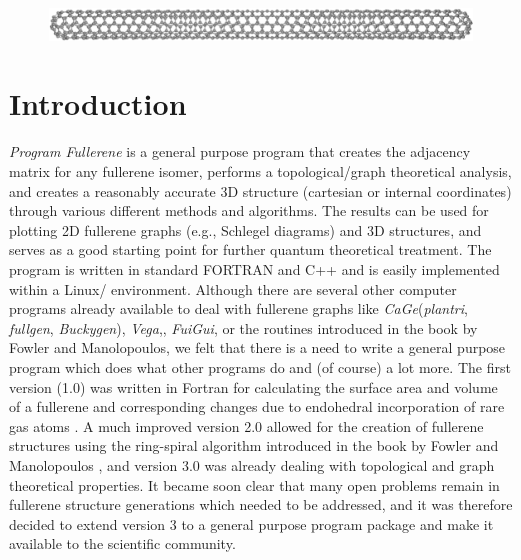 \documentclass[article,a4paper,twoside]{memoir}
\let\acr=\textsmaller
\newcommand{\program}[1]{\textit{#1}}
\begin{document}
 \begin{figure}[htbp]
   	\centering
  	\includegraphics[width=\textwidth]{C840.png}
 \end{figure} 

\clearpage

\section{Introduction}
\textit{Program Fullerene} is a general purpose program that creates the adjacency matrix for any fullerene isomer, 
performs a topological/graph theoretical analysis, and creates a reasonably accurate 3D structure (cartesian or internal
coordinates) through various different methods and algorithms. The results can be used for plotting 2D fullerene graphs 
(e.g., Schlegel diagrams) and 3D structures, and serves as a good starting point for further quantum theoretical treatment.
The program is written in standard FORTRAN and C++ and is easily implemented within a Linux/\acr{UNIX} environment.
Although there are several other computer programs already available to deal with fullerene graphs like 
\program{CaGe}(\program{plantri},\cite{Brinkmann05} \program{fullgen},\cite{Brinkmann} \program{Buckygen}\cite{Goedgebeur,Goedgebeur1}),\cite{Brinkmanx}
\program{Vega},\cite{Pisanski}, \program{FuiGui},\cite{FuiGui}  or the routines introduced in the book by Fowler and Manolopoulos,\cite{Atlas}
we felt that there is a need to write a general purpose program which does what other programs do and (of course) a lot more.
The first version (1.0) was written in Fortran for calculating the surface area and volume of a fullerene and corresponding changes due to endohedral 
incorporation of rare gas atoms \cite{Tonner}. A much improved version 2.0 allowed for the creation of fullerene structures using
the ring-spiral algorithm introduced in the book by Fowler and Manolopoulos \cite{Atlas}, and version 3.0 was already dealing with
topological and graph theoretical properties. It became soon clear that many open problems remain in fullerene structure generations
which needed to be addressed, and it was therefore decided to extend version 3 to a general purpose program package and make it available
to the scientific community.
\end{document}
